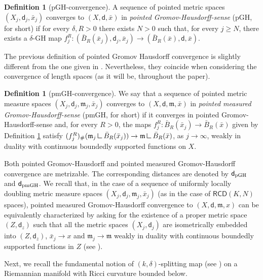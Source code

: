 \documentclass[10pt]{article}
\theoremstyle{definition}
\newtheorem{definition}[thm]{Definition}
\newcommand{\RCD}{\mathsf{RCD}}
\newcommand{\sd}{\mathsf{d}}
\newcommand{\m}{\mathfrak{m}}
\newcommand{\mres}{\mathbin{\vrule height 1.6ex depth 0pt width
0.13ex\vrule height 0.13ex depth 0pt width 1.3ex}}
\begin{document}
\begin{definition}[pGH-convergence] \label{D2}
    A sequence of pointed metric spaces $(X_j,\sd_j,\bar{x}_j)$ converges to $(X,\sd,\bar{x})$ in \emph{pointed Gromov-Hausdorff-sense} (pGH, for short) if for every $\delta,R>0$ there exists $N>0$ such that, for every $j \geq N$, there exists a $\delta$-GH map $f_j^{R}:(\bar{B}_R(\bar{x}_j),\sd_j,\bar{x}_j) \to (\bar{B}_R(\bar{x}),\sd,\bar{x})$.
\end{definition}

The previous definition of pointed Gromov Hausdorff convergence is slightly different from the one given in \cite[p. 272]{YuBurago_1992}. Nevertheless, they coincide when considering the convergence of length spaces (as it will be, throughout the paper).

\begin{definition}[pmGH-convergence]
    We say that a sequence of pointed metric measure spaces $(X_j,\sd_j, \m_j, \bar{x}_j)$ converges to $(X,\sd,\m,\bar{x})$ in \emph{pointed measured Gromov-Hausdorff-sense} (pmGH, for short) if it converges in pointed Gromov-Hausdorff-sense and, for every $R>0$, the maps $f_j^{R}:\bar{B}_R(\bar{x}_j) \to \bar{B}_R(\bar{x})$ given by Definition \ref{D2} satisfy $(f_j^{R})_{\#} (\m_j \mres \bar{B}_R(\bar{x}_j)) \to \m \mres \bar{B}_R(\bar{x}) $, as $j\to \infty$, weakly in duality with continuous boundedly supported functions on $X$.
\end{definition}

Both pointed Gromov-Hausdorff and pointed measured Gromov-Hausdorff convergence are metrizable. The corresponding distances are denoted by $\sd_{{\rm pGH}}$ and $\sd_{{\rm pmGH}}$.
We recall that, in the case of a sequence of uniformly locally doubling metric measure spaces $(X_j,\sd_j, \m_j,\bar{x}_j)$
(as in the case of $\RCD(K, N)$ spaces), pointed measured Gromov-Hausdorff convergence to $(X,\sd,\m,x)$ can be equivalently characterized by asking for the existence of a proper
metric space $(Z, \sd_z )$ such that all the metric spaces $(X_j
, \sd_j)$ are isometrically embedded
into $(Z, \sd_z )$, $\bar{x}_j \to x$ and $\m_j \to \m$ weakly in duality with continuous boundedly supported functions in $Z$ (see \cite{GMS13}). 

Next, we recall the fundamental notion of  $(k,\delta)$-splitting map (see \cite{ColdingConv, ChCo1, Colding1, CheegerNaberCodim4}) on a Riemannian manifold with Ricci curvature bounded below. 
\end{document}
